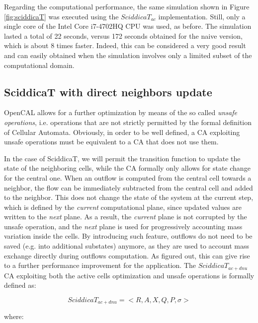 Regarding the computational performance, the same simulation shown in
Figure \ref{fig:sciddicaT} was executed using the $SciddicaT_{ac}$
implementation. Still, only a single core of the Intel Core i7-4702HQ
CPU was used, as before. The simulation lasted a total of 22 seconds,
versus 172 seconds obtained for the naive version, which is about 8
times faster. Indeed, this can be considered a very good result and
can easily obtained when the simulation involves only a limited subset
of the computational domain.

\subsection{SciddicaT with direct neighbors update}\label{sec:sciddicaT_extended}
OpenCAL allows for a further optimization by means of the so called
\emph{unsafe operations}, i.e. operations that are not strictly
permitted by the formal definition of Cellular Automata. Obviously, in
order to be well defined, a CA exploiting unsafe operations must be
equivalent to a CA that does not use them.

In the case of SciddicaT, we will permit the transition function to
update the state of the neighboring cells, while the CA formally only
allows for state change for the central one. When an outflow is
computed from the central cell towards a neighbor, the flow can be
immediately subtracted from the central cell and added to the
neighbor. This does not change the state of the system at the current
step, which is defined by the \emph{current} computational plane,
since updated values are written to the \emph{next} plane. As a
result, the \emph{current} plane is not corrupted by the unsafe
operation, and the \emph{next} plane is used for progressively
accounting mass variation inside the cells. By introducing such
feature, outflows do not need to be saved (e.g. into additional
substates) anymore, as they are used to account mass exchange directly
during outflows computation. As figured out, this can give rise to a
further performance improvement for the application. The
$SciddicaT_{ac+dnu}$ CA exploiting both the active cells optimization
and unsafe operations is formally defined as:


$$SciddicaT_{ac+dnu} = < R, A, X, Q , P, \sigma  >$$

where:

